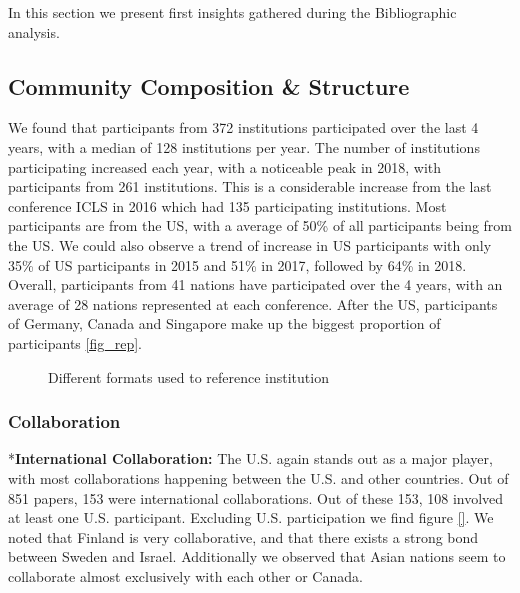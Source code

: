 \documentclass[article,twocolumn]{IEEEtran}
\begin{document}
In this section we present first insights gathered during the
Bibliographic analysis.


    \hypertarget{community-composition-structure}{%
\subsection{Community Composition \&
Structure}\label{community-composition-structure}}

We found that participants from 372 institutions participated over the
last 4 years, with a median of 128 institutions per year. The number of
institutions participating increased each year, with a noticeable peak
in 2018, with participants from 261 institutions. This is a considerable
increase from the last conference ICLS in 2016 which had 135
participating institutions. Most participants are from the US, with a
average of 50\% of all participants being from the US. We could also
observe a trend of increase in US participants with only 35\% of US
participants in 2015 and 51\% in 2017, followed by 64\% in 2018.
Overall, participants from 41 nations have participated over the 4
years, with an average of 28 nations represented at each conference.
After the US, participants of Germany, Canada and Singapore make up the
biggest proportion of participants \ref{fig_rep}.


    \begin{figure}
        \begin{center}\end{center}
        \caption{Different formats used to reference institution}
        \label{figrep}
    \end{figure}
    
    \hypertarget{collaboration}{%
\subsubsection{Collaboration}\label{collaboration}}

*\textbf{International Collaboration:} The U.S. again stands out as a
major player, with most collaborations happening between the U.S. and
other countries. Out of 851 papers, 153 were international
collaborations. Out of these 153, 108 involved at least one U.S.
participant. Excluding U.S. participation we find figure \ref{}. We
noted that Finland is very collaborative, and that there exists a strong
bond between Sweden and Israel. Additionally we observed that Asian
nations seem to collaborate almost exclusively with each other or
Canada.
\end{document}
